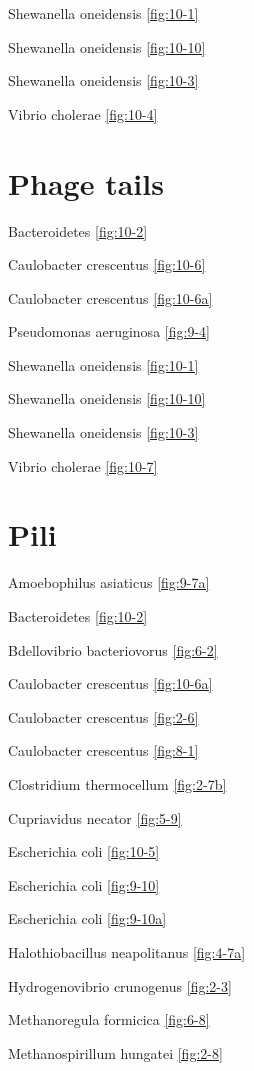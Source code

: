 \documentclass[]{tufte-book}
\begin{document}
Shewanella oneidensis \ref{fig:10-1}

Shewanella oneidensis \ref{fig:10-10}

Shewanella oneidensis \ref{fig:10-3}

Vibrio cholerae \ref{fig:10-4}

\section{\texorpdfstring{\textbf{Phage
tails}}{Phage tails}}\label{phage-tails}

Bacteroidetes \ref{fig:10-2}

Caulobacter crescentus \ref{fig:10-6}

Caulobacter crescentus \ref{fig:10-6a}

Pseudomonas aeruginosa \ref{fig:9-4}

Shewanella oneidensis \ref{fig:10-1}

Shewanella oneidensis \ref{fig:10-10}

Shewanella oneidensis \ref{fig:10-3}

Vibrio cholerae \ref{fig:10-7}

\section{\texorpdfstring{\textbf{Pili}}{Pili}}\label{pili}

Amoebophilus asiaticus \ref{fig:9-7a}

Bacteroidetes \ref{fig:10-2}

Bdellovibrio bacteriovorus \ref{fig:6-2}

Caulobacter crescentus \ref{fig:10-6a}

Caulobacter crescentus \ref{fig:2-6}

Caulobacter crescentus \ref{fig:8-1}

Clostridium thermocellum \ref{fig:2-7b}

Cupriavidus necator \ref{fig:5-9}

Escherichia coli \ref{fig:10-5}

Escherichia coli \ref{fig:9-10}

Escherichia coli \ref{fig:9-10a}

Halothiobacillus neapolitanus \ref{fig:4-7a}

Hydrogenovibrio crunogenus \ref{fig:2-3}

Methanoregula formicica \ref{fig:6-8}

Methanospirillum hungatei \ref{fig:2-8}
\end{document}
